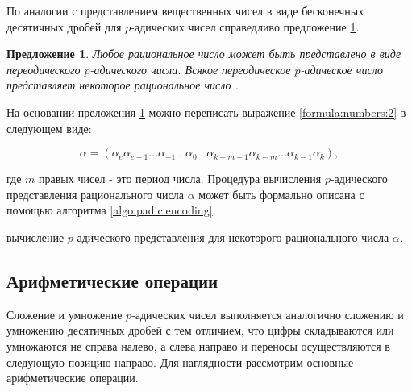 \documentclass[master, och, diploma, times]{sty/SCWorks}
\theoremstyle{plain}
\newtheorem{proposition}{Предложение}[section]
\theoremstyle{definition}
\numberwithin{equation}{section}
\begin{document}
По аналогии с представлением вещественных чисел в виде бесконечных десятичных дробей для $p$-адических чисел справедливо предложение \ref{pros:numbers:1}.

\begin{proposition}\label{pros:numbers:1}
Любое рациональное число может быть представлено в виде переодического $p$-адического числа. Всякое переодическое $p$-адическое число представляет некоторое рациональное число \cite{bib:analysis:kobliz}.
\end{proposition}

На основании преложения \ref{pros:numbers:1} можно переписать выражение \ref{formula:numbers:2} в следующем виде:

\begin{equation}\label{formula:numbers:3}
\alpha=(\alpha_{e}\alpha_{e-1}\dots\alpha_{-1} \; . \; \alpha_0\;.\;\alpha_{k-m-1}\alpha_{k-m}\dots\alpha_{k-1}\alpha_{k}),
\end{equation}

\noindent где $m$ правых чисел - это период числа. Процедура вычисления $p$-адического представления рационального числа $\alpha$ может быть формально описана с помощью алгоритма \ref{algo:padic:encoding}.

\begin{algorithm}
\DontPrintSemicolon %
\caption{вычисление $p$-адического представления для некоторого рационального числа $\alpha$.}
\label{algo:padic:encoding}
\end{algorithm}


\subsection{Арифметические операции}

Сложение и умножение $p$-адических чисел выполняется аналогично сложению и умножению десятичных дробей с тем отличием, что цифры складываются или умножаются не справа налево, а слева направо и переносы осуществляются в следующую позицию направо. Для наглядности рассмотрим основные арифметические операции.
\end{document}
